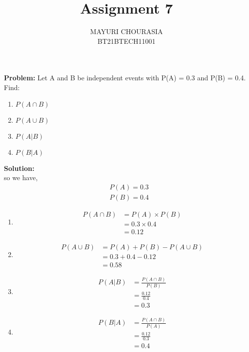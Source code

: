 \documentclass[journal,12pt,twocolumn]{IEEEtran}
\title{Assignment 7}
\author{MAYURI CHOURASIA\\BT21BTECH11001}
\date{}
\newcommand{\PROBLEM}{\noindent \textbf{Problem: }}
\newcommand{\solution}{\noindent \textbf{Solution: }}
\begin{document}
\maketitle
\PROBLEM Let A and B be independent events with P(A) = 0.3 and P(B) = 0.4. Find:\\
\begin{enumerate}
    \item $P(A \cap B)$
    \item $P(A \cup B)$
    \item $P(A|B)$
    \item $P(B|A)$
\end{enumerate}
\solution \\
so we have,\\
\begin{align}
    &P(A)=0.3\\
    &P(B)=0.4
\end{align}
\begin{enumerate}
\item \begin{align}
    P(A \cap B) &= P(A)\times P(B)\\
    &= 0.3 \times 0.4\\
    &= 0.12
\end{align}

\item \begin{align}
P(A \cup B) &= P(A) + P(B) - P(A \cup B)\\
&= 0.3 + 0.4 - 0.12\\
&=0.58
\end{align}
\item \begin{align}
    P(A | B) &= \frac{P(A \cap B)}{P(B)}\\
&= \frac{0.12}{0.4}\\
&=0.3
\end{align}
\item \begin{align}
    P(B | A) &= \frac{P(A \cap B)}{P(A)}\\
&= \frac{0.12}{0.3}\\
&=0.4
\end{align}
\end{enumerate}
\end{document}
